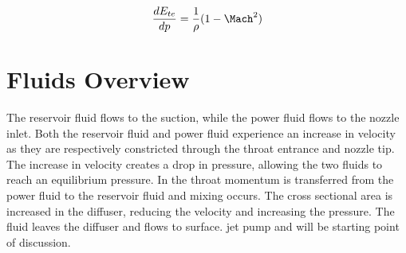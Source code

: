 \begin{equation}
\frac{dE_{te}}{dp} = \frac{1}{\rho}(1 - \Mach^2)
\label{dete_dp}
\end{equation}

\section{Fluids Overview}

The reservoir fluid flows to the suction, while the power fluid flows to the nozzle inlet. Both the reservoir fluid and power fluid experience an increase in velocity as they are respectively constricted through the throat entrance and nozzle tip. The increase in velocity creates a drop in pressure, allowing the two fluids to reach an equilibrium pressure. In the throat momentum is transferred from the power fluid to the reservoir fluid and mixing occurs. The cross sectional area is increased in the diffuser, reducing the velocity and increasing the pressure. The fluid leaves the diffuser and flows to surface.  jet pump and will be starting point of discussion.